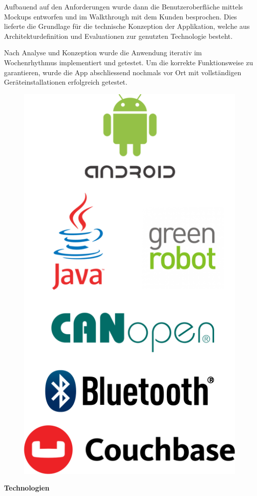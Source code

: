 Aufbauend auf den Anforderungen wurde dann die Benutzeroberfläche mittels Mockups entworfen und im Walkthrough mit dem Kunden besprochen. Dies lieferte die Grundlage für die technische Konzeption der Applikation, welche aus Architekturdefinition und Evaluationen zur genutzten Technologie besteht.

Nach Analyse und Konzeption wurde die Anwendung iterativ im Wochenrhythmus implementiert und getestet. Um die korrekte Funktionsweise zu garantieren, wurde die App abschliessend nochmals vor Ort mit vollständigen Geräteinstallationen erfolgreich getestet.

\begin{figure}
	\includegraphics[scale=0.26]{start/img/logos}
\end{figure}
\textbf{Technologien}

